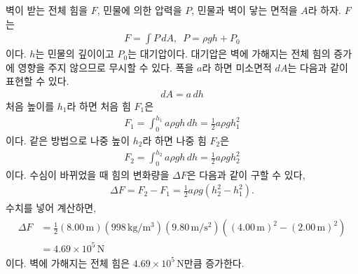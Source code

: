 \documentclass[floatfix,nofootinbib,superscriptaddress,fleqn]{revtex4-2}
\begin{document}
벽이 받는 전체 힘을 $F$, 민물에 의한 압력을 $P$, 
민물과 벽이 닿는 면적을 $A$라 하자.
$F$는
\begin{align}
  F = \int P\,dA,\,\,\,P = \rho g h + P_0
\end{align}
이다. $h$는 민물의 깊이이고 $P_0$는 대기압이다. 대기압은 벽에 가해지는 전체 힘의
증가에 영향을 주지 않으므로 무시할 수 있다.
폭을 $a$라 하면 미소면적 $dA$는 다음과 같이 표현할 수 있다.
\begin{align}
  dA = a\,dh
\end{align}
처음 높이를 $h_1$라 하면 처음 힘 $F_1$은
\begin{align}
  F_1 = \int_0^{h_1}a\rho g h\,dh = \frac{1}{2}a\rho g h^2_1
\end{align}
이다. 같은 방법으로
나중 높이 $h_2$라 하면 나중 힘 $F_2$은
\begin{align}
  F_2 = \int_0^{h_2}a\rho g h\,dh = \frac{1}{2}a\rho g h^2_2
\end{align}
이다. 수심이 바뀌었을 때 힘의 변화량을 $\Delta F$은 다음과 같이 구할 수 있다,
\begin{align}
  \Delta F = F_2 - F_1 = \frac{1}{2}a\rho g \left(h^2_2-h^2_1\right).
\end{align}
수치를 넣어 계산하면,
\begin{align}
  \begin{split}
    \Delta F &=\frac{1}{2}(8.00\,\mathrm{m})
    (998\,\mathrm{kg/m^3}) (9.80\,\mathrm{m/s^2}) 
    \left((4.00\,\mathrm{m})^2-(2.00\,\mathrm{m})^2\right)  \\
    &= 4.69\times 10^5\,\mathrm{N}
  \end{split}
\end{align}
이다. 벽에 가해지는 전체 힘은 $4.69\times 10^5\,\mathrm{N}$만큼 증가한다.
\vspace{1.cm}
\end{document}
